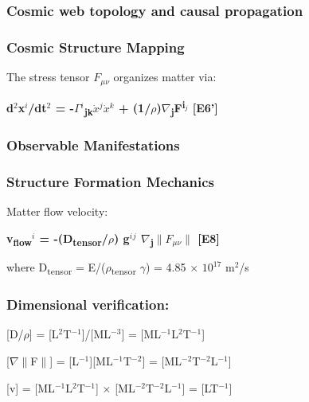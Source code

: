 \documentclass[11pt,a4paper]{article}
\begin{document}
\subsubsection{Cosmic web topology and causal propagation}

\subsubsection{Cosmic Structure Mapping}
The stress tensor $F_{\mu\nu}$ organizes matter via:

\textbf{d$^{2}$x$^{i}$/dt$^{2}$ = -$\Gamma$$^{i}$\textsubscript{jk}$\dot{x}$$^{j}$$\dot{x}$$^{k}$ + (1/\allowbreak{}$\rho$)$\nabla$\textsubscript{j}F\textsuperscript{i$_{j}$} [E6']}

\begin{mdframed}[linecolor=accent,linewidth=0.5pt,backgroundcolor=callout-bg,leftline=true,rightline=true,topline=true,bottomline=true,innerleftmargin=8pt,innerrightmargin=8pt,innertopmargin=6pt,innerbottommargin=6pt]
\subsubsection{Observable Manifestations}
\end{mdframed}

\subsubsection{Structure Formation Mechanics}
Matter flow velocity:

\textbf{v\textsubscript{flow}$^{i}$ = -(D\textsubscript{tensor}/$\rho$) g$^{i}$$^{j}$ $\nabla$\textsubscript{j}$\|$$F_{\mu\nu}$$\|$ [E8]}

where D\textsubscript{tensor} = E/\allowbreak{}($\rho$\textsubscript{tensor} $\gamma$) = 4.85 $\times$ $10^{17}$ m$^{2}$/s

\begin{mdframed}[linecolor=accent,linewidth=0.5pt,backgroundcolor=callout-bg,leftline=true,rightline=true,topline=true,bottomline=true,innerleftmargin=8pt,innerrightmargin=8pt,innertopmargin=6pt,innerbottommargin=6pt]
\subsubsection{Dimensional verification:}
[D/\allowbreak{}$\rho$] = [L$^{2}$T$^{-1}$]/[ML$^{-3}$] = [ML$^{-1}$L$^{2}$T$^{-1}$]

[$\nabla$$\|$F$\|$] = [L$^{-1}$][ML$^{-1}$T$^{-2}$] = [ML$^{-2}$T$^{-2}$L$^{-1}$]

[v] = [ML$^{-1}$L$^{2}$T$^{-1}$] $\times$ [ML$^{-2}$T$^{-2}$L$^{-1}$] = [LT$^{-1}$] \checkmark{}
\end{mdframed}
\end{document}
